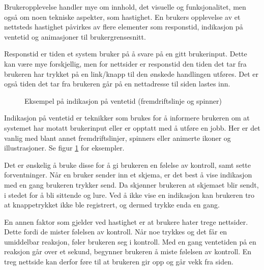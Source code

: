Brukeropplevelse handler mye om innhold, det visuelle og funksjonalitet, men også om noen tekniske aspekter, som hastighet. En brukers opplevelse av et nettsteds hastighet påvirkes av flere elementer som responstid, indikasjon på ventetid og animasjoner til brukergrensesnitt.

Responstid er tiden et system bruker på å svare på en gitt brukerinput.
Dette kan være mye forskjellig, men for nettsider er responstid den tiden det tar fra brukeren har trykket på en link/knapp til den ønskede handlingen utføres. Det er også tiden det tar fra brukeren går på en nettadresse til siden lastes inn.

\begin{figure}[H]
    \centering
    \caption{Eksempel på indikasjon på ventetid (fremdriftslinje og spinner)}
    \label{fig:analysis-loading-indicators}
\end{figure}

Indikasjon på ventetid er teknikker som brukes for å informere brukeren om at systemet har motatt brukerinput eller er opptatt med å utføre en jobb. Her er det vanlig med blant annet fremdriftslinjer, spinners eller animerte ikoner og illustrasjoner. Se figur \ref{fig:analysis-loading-indicators} for eksempler.

Det er ønskelig å bruke disse for å gi brukeren en følelse av kontroll, samt sette forventninger. Når en bruker sender inn et skjema, er det best å vise indikasjon med en gang brukeren trykker send. Da skjønner brukeren at skjemaet blir sendt, i stedet for å bli sittende og lure. Ved å ikke vise en indikasjon kan brukeren tro at knappetrykket ikke ble registrert, og dermed trykke enda en gang. 

En annen faktor som gjelder ved hastighet er at brukere hater trege nettsider. Dette fordi de mister følelsen av kontroll. Når noe trykkes og det får en umiddelbar reaksjon, føler brukeren seg i kontroll. Med en gang ventetiden på en reaksjon går over et sekund, begynner brukeren å miste følelsen av kontroll. En treg nettside kan derfor føre til at brukeren gir opp og går vekk fra siden.



